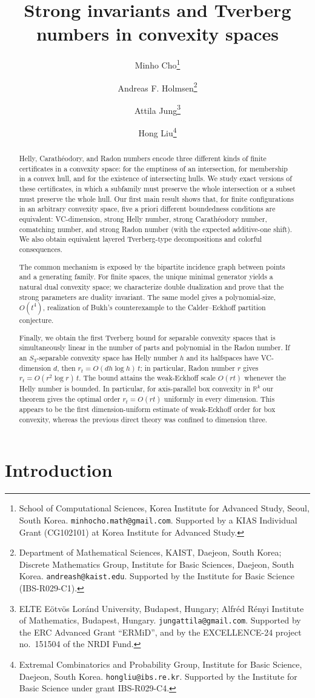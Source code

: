 \documentclass[11pt]{article}
\title{Strong invariants and Tverberg numbers in convexity spaces}
\author{
Minho Cho\thanks{School of Computational Sciences, Korea Institute for Advanced Study, Seoul, South Korea. \texttt{minhocho.math@gmail.com}. Supported by a KIAS Individual Grant (CG102101) at Korea Institute for Advanced Study.}
\and
Andreas F. Holmsen\thanks{Department of Mathematical Sciences, KAIST, Daejeon, South Korea; Discrete Mathematics Group, Institute for Basic Sciences, Daejeon, South Korea. \texttt{andreash@kaist.edu}. Supported by the Institute for Basic Science (IBS-R029-C1).}
\and
Attila Jung\thanks{ELTE E\"otv\"os Lor\'and University, Budapest, Hungary; Alfr\'ed R\'enyi Institute of Mathematics, Budapest, Hungary.
\texttt{jungattila@gmail.com}. Supported by the ERC Advanced Grant ``ERMiD'', and by the EXCELLENCE-24 project no.~151504 of the NRDI Fund.}
\and 
Hong Liu\thanks{Extremal Combinatorics and Probability Group, Institute for Basic Science, Daejeon, South Korea. \texttt{hongliu@ibs.re.kr}. Supported by the Institute for Basic Science under grant IBS-R029-C4.}
}
\date{}
\theoremstyle{definition}
\renewcommand{\Re}{\mathbb{R}}
\begin{document}
\maketitle

\begin{abstract}
Helly, Carath\'eodory, and Radon numbers encode three different kinds of finite certificates in a convexity space: for the emptiness of an intersection, for membership in a convex hull, and for the existence of intersecting hulls. We study exact versions of these certificates, in which a subfamily must preserve the whole intersection or a subset must preserve the whole hull. Our first main result shows that, for finite configurations in an arbitrary convexity space, five a priori different boundedness conditions are equivalent: VC-dimension, strong Helly number, strong Carath\'eodory number, comatching number, and strong Radon number (with the expected additive-one shift). We also obtain equivalent layered Tverberg-type decompositions and colorful consequences.

The common mechanism is exposed by the bipartite incidence graph between points and a generating family. For finite spaces, the unique minimal generator yields a natural dual convexity space; we characterize double dualization and prove that the strong parameters are duality invariant. The same model gives a polynomial-size, $O(t^4)$, realization of Bukh's counterexample to the Calder--Eckhoff partition conjecture.

Finally, we obtain the first Tverberg bound for separable convexity
spaces that is simultaneously linear in the number of parts and
polynomial in the Radon number. If an $S_3$-separable convexity space
has Helly number $h$ and its halfspaces have VC-dimension $d$, then
$r_t=O(dh\log h)\,t$; in particular, Radon number $r$ gives
$r_t=O(r^2\log r)\,t$. The bound attains the weak-Eckhoff scale $O(rt)$ whenever the Helly number is bounded. In particular, for axis-parallel box convexity in $\Re^k$ our theorem gives the optimal order
$r_t=O(rt)$ uniformly in every dimension. This appears to be the
first dimension-uniform estimate of weak-Eckhoff order for box
convexity, whereas the previous direct theory was confined to
dimension three.
\end{abstract}



\section{Introduction}\label{sec:intro}
\end{document}
